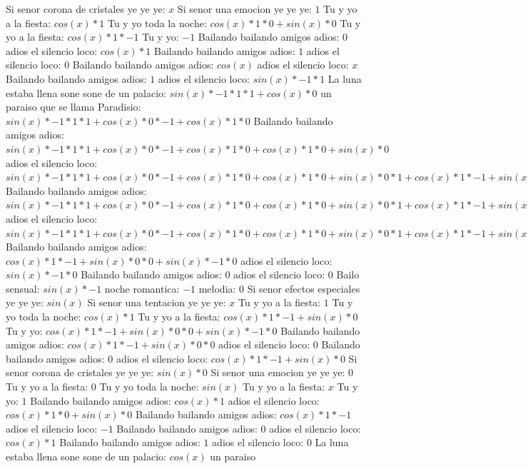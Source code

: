 \documentclass{article}
\begin{document}
\newline Si senor corona de cristales ye ye ye: $x$ Si senor una emocion ye ye ye: $1$  \newline Tu y yo a la fiesta: $cos(x)*1$ Tu y yo toda la noche: $cos(x)*1*0+sin(x)*0$ Tu y yo a la fiesta: $cos(x)*1*-1$ Tu y yo: $-1$ Bailando bailando amigos adios: $0$  \newline adios el silencio loco: $cos(x)*1$ Bailando bailando amigos adios: $1$ adios el silencio loco: $0$  \newline Bailando bailando amigos adios: $cos(x)$  \newline adios el silencio loco: $x$ Bailando bailando amigos adios: $1$  \newline adios el silencio loco: $sin(x)*-1*1$ La luna estaba llena sone sone de un palacio: $sin(x)*-1*1*1+cos(x)*0$ un paraiso que se llama Paradisio: ${sin(x)*-1*1*1+cos(x)*0}*-1+cos(x)*1*0$ Bailando bailando amigos adios: ${sin(x)*-1*1*1+cos(x)*0}*-1+cos(x)*1*0+cos(x)*1*0+sin(x)*0$ adios el silencio loco: ${{sin(x)*-1*1*1+cos(x)*0}*-1+cos(x)*1*0+cos(x)*1*0+sin(x)*0}*1+{cos(x)*1*-1+sin(x)*0}*0$ Bailando bailando amigos adios: ${{sin(x)*-1*1*1+cos(x)*0}*-1+cos(x)*1*0+cos(x)*1*0+sin(x)*0}*1+{cos(x)*1*-1+sin(x)*0}*0+{cos(x)*1*-1+sin(x)*0}*0+sin(x)*-1*0$ adios el silencio loco: ${{sin(x)*-1*1*1+cos(x)*0}*-1+cos(x)*1*0+cos(x)*1*0+sin(x)*0}*1+{cos(x)*1*-1+sin(x)*0}*0+{cos(x)*1*-1+sin(x)*0}*0+sin(x)*-1*0$  \newline Bailando bailando amigos adios: ${cos(x)*1*-1+sin(x)*0}*0+sin(x)*-1*0$  \newline adios el silencio loco: $sin(x)*-1*0$ Bailando bailando amigos adios: $0$ adios el silencio loco: $0$  \newline Bailo sensual: $sin(x)*-1$ noche romantica: $-1$ melodia: $0$  \newline Si senor efectos especiales ye ye ye: $sin(x)$  \newline Si senor una tentacion ye ye ye: $x$ Tu y yo a la fiesta: $1$  \newline Tu y yo toda la noche: $cos(x)*1$ Tu y yo a la fiesta: $cos(x)*1*-1+sin(x)*0$ Tu y yo: ${cos(x)*1*-1+sin(x)*0}*0+sin(x)*-1*0$ Bailando bailando amigos adios: ${cos(x)*1*-1+sin(x)*0}*0$ adios el silencio loco: $0$ Bailando bailando amigos adios: $0$  \newline adios el silencio loco: $cos(x)*1*-1+sin(x)*0$  \newline Si senor corona de cristales ye ye ye: $sin(x)*0$ Si senor una emocion ye ye ye: $0$ Tu y yo a la fiesta: $0$  \newline Tu y yo toda la noche: $sin(x)$  \newline Tu y yo a la fiesta: $x$ Tu y yo: $1$  \newline Bailando bailando amigos adios: $cos(x)*1$ adios el silencio loco: $cos(x)*1*0+sin(x)*0$ Bailando bailando amigos adios: $cos(x)*1*-1$ adios el silencio loco: $-1$ Bailando bailando amigos adios: $0$  \newline adios el silencio loco: $cos(x)*1$ Bailando bailando amigos adios: $1$ adios el silencio loco: $0$  \newline La luna estaba llena sone sone de un palacio: $cos(x)$  \newline un paraiso 
\end{document}
